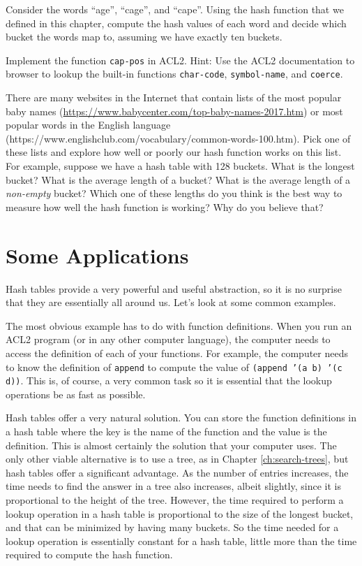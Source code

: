 \begin{ExerciseList}
\Exercise Consider the words ``age'', ``cage'', and ``cape''. Using the hash function that we 
defined in this chapter, compute the hash values of each word and decide which bucket the
words map to, assuming we have exactly ten buckets.

\Exercise Implement the function \texttt{cap-pos} in ACL2. Hint: Use the ACL2
documentation to browser to lookup the built-in functions \texttt{char-code}, \texttt{symbol-name},
and \texttt{coerce}.

\Exercise There are many websites in the Internet that contain lists of the most popular baby names
(\url{https://www.babycenter.com/top-baby-names-2017.htm}) or most popular words in the English
language (https://www.englishclub.com/vocabulary/common-words-100.htm). Pick one of these lists 
and explore how well or poorly our hash function works on this list. For example, suppose we have 
a hash table with 128 buckets. What is the longest bucket? What is the average length of a bucket?
What is the average length of a \emph{non-empty} bucket? Which one of these lengths do you think
is the best way to measure how well the hash function is working? Why do you believe that?
\end{ExerciseList}

\section{Some Applications}

Hash tables provide a very powerful and useful abstraction, so it
is no surprise that they are essentially all around us. Let's look
at some common examples.

The most obvious example has to do with function definitions. When
you run an ACL2 program (or in any other computer language), the
computer needs to access the definition of each of your functions.
For example, the computer needs to know the definition of 
\texttt{append} to compute the value of \texttt{(append '(a b) '(c d))}.
This is, of course, a very common task so it is essential that the
lookup operations be as fast as possible.

Hash tables offer a very natural solution. You can store the function
definitions in a hash table where the key is the name of the function
and the value is the definition. This is almost certainly the solution
that your computer uses. The only other viable alternative is to use a
tree, as in Chapter \ref{ch:search-trees}, but hash tables offer a
significant advantage. As the number of entries increases, the time 
needs to find the answer in a tree also increases, albeit slightly,
since it is proportional to the height of the tree.
However, the time required to perform a lookup operation in a hash table
is proportional to the size of the longest bucket, and that can be
minimized by having many buckets. So the time needed for a lookup 
operation is essentially constant for a hash table, little more than
the time required to compute the hash function.


